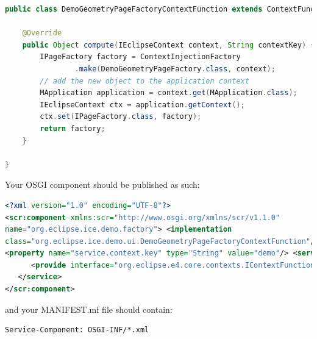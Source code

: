 \begin{lstlisting}[language=java]
public class DemoGeometryPageFactoryContextFunction extends ContextFunction {

    @Override
    public Object compute(IEclipseContext context, String contextKey) {
        IPageFactory factory = ContextInjectionFactory
                .make(DemoGeometryPageFactory.class, context);
        // add the new object to the application context
        MApplication application = context.get(MApplication.class);
        IEclipseContext ctx = application.getContext();
        ctx.set(IPageFactory.class, factory);
        return factory;
    }

}
\end{lstlisting}

Your OSGI component should be published as such:

\begin{lstlisting}[language=xml]
<?xml version="1.0" encoding="UTF-8"?>
<scr:component xmlns:scr="http://www.osgi.org/xmlns/scr/v1.1.0"
name="org.eclipse.ice.demo.factory"> <implementation
class="org.eclipse.ice.demo.ui.DemoGeometryPageFactoryContextFunction"/>
<property name="service.context.key" type="String" value="demo"/> <service>
      <provide interface="org.eclipse.e4.core.contexts.IContextFunction"/>
   </service>
</scr:component>
\end{lstlisting}

and your MANIFEST.mf file should contain:

\begin{lstlisting}[language=xml]
Service-Component: OSGI-INF/*.xml
\end{lstlisting}